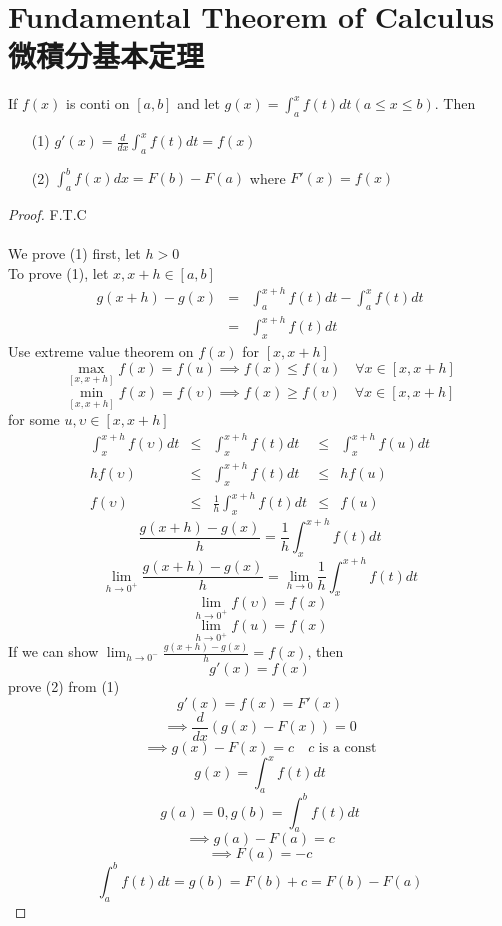 \section{Fundamental Theorem of Calculus 微積分基本定理}
\begin{theorem}
If $f(x)$ is conti on $[a, b]$ and let $\displaystyle g(x) = \int_a^x f(t)dt (a\leq x \leq b)$. Then\\
\begin{itemize}
\item[(1)] $\displaystyle g'(x) = \frac{d}{dx} \int_a^x f(t) dt = f(x)$
\item[(2)] $\displaystyle \int_a^b f(x) dx = F(b) - F(a)$ where $F'(x) = f(x)$\\
\end{itemize}
\end{theorem}
\begin{proof} F.T.C\\\\
We prove (1) first, let $h > 0$\\
To prove (1), let $x, x+h \in [a, b]$\\
$$\begin{array}{rcl}
g(x+h) - g(x) & = & \displaystyle \int_a^{x+h} f(t)dt - \int_a^x f(t)dt\\
& = & \displaystyle \int_x^{x+h} f(t) dt
\end{array}$$
Use extreme value theorem on $f(x)$ for $[x, x+h]$
$$\displaystyle \max_{[x, x+h]} f(x) = f(u) \implies f(x) \leq f(u) \quad \forall x \in [x, x+h]$$
$$\displaystyle \min_{[x, x+h]} f(x) = f(\upsilon) \implies f(x) \geq f(\upsilon) \quad \forall x \in [x, x+h]$$
for some $u, \upsilon \in [x, x+h]$\\
$$\begin{array}{rcccl}
\displaystyle \int_x^{x+h} f(\upsilon)dt & \leq & \displaystyle \int_x^{x+h} f(t)dt & \leq & \displaystyle \int_x^{x+h} f(u) dt\\
\displaystyle h f(\upsilon) & \leq & \displaystyle \int_x^{x+h} f(t)dt & \leq & h f(u)\\
\displaystyle f(\upsilon) & \leq & \displaystyle \frac{1}{h} \int_x^{x+h} f(t)dt & \leq &f(u)
\end{array}$$
$$\displaystyle \frac{g(x+h)-g(x)}{h} = \frac{1}{h} \int_x^{x+h} f(t)dt$$
$$\displaystyle \lim_{h \to 0^+} \frac{g(x+h) -g(x)}{h} = \lim_{h \to 0} \frac{1}{h} \int_x^{x+h} f(t)dt$$
$$\displaystyle \lim_{h \to 0^+} f(\upsilon) = f(x)$$
$$\displaystyle \lim_{h \to 0^+} f(u) = f(x)$$
If we can show $\displaystyle \lim_{h \to 0^-} \frac{g(x+h)-g(x)}{h} = f(x)$, then
$$g'(x) = f(x)$$
prove (2) from (1)
$$g'(x) = f(x) = F'(x)$$
$$\displaystyle \implies \frac{d}{dx} (g(x)-F(x)) = 0$$
$$\implies g(x) - F(x) = c  \quad c \text{ is a const}$$
$$\displaystyle g(x) = \int_a^x f(t)dt$$
$$\displaystyle g(a) = 0, g(b) = \int_a^b f(t)dt$$
$$\displaystyle \implies g(a) - F(a) = c$$
$$\implies F(a) = - c$$
$$\displaystyle \int_a^b f(t)dt = g(b) = F(b) + c = F(b) -F(a)$$
\end{proof}
